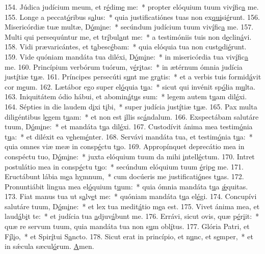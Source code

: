 154. Júdica judícium meum, et r\uline{é}dim\uline{e} me:~* propter elóquium tuum viv\uline{í}fic\uline{a} me.
155. Longe a peccat\uline{ó}ribus s\uline{a}lus:~* quia justificatiónes tuas non ex\uline{qui}si\uline{é}runt.
156. Misericórdiæ tuæ multæ, D\uline{ó}m\uline{i}ne:~* secúndum judícium tuum viv\uline{í}fic\uline{a} me.
157. Multi qui persequúntur me, et tr\uline{í}bul\uline{a}nt me:~* a testimóniis tuis non d\uline{e}clin\uline{á}vi.
158. Vidi prævaricántes, et t\uline{a}besc\uline{é}bam:~* quia elóquia tua non cust\uline{o}di\uline{é}runt.
159. Vide quóniam mandáta tua diléxi, D\uline{ó}m\uline{i}ne:~* in misericórdia tua viv\uline{í}fic\uline{a} me.
160. Princípium verbórum tuórum, v\uline{é}r\uline{i}tas:~* in ætérnum ómnia judícia just\uline{í}tiæ t\uline{u}æ.
161. Príncipes persecúti s\uline{u}nt me gr\uline{a}tis:~* et a verbis tuis formid\uline{á}vit cor m\uline{e}um.
162. Lætábor ego super el\uline{ó}quia t\uline{u}a:~* sicut qui invénit sp\uline{ó}lia m\uline{u}lta.
163. Iniquitátem ódio hábui, et abomin\uline{á}t\uline{u}s sum:~* legem autem t\uline{u}am dil\uline{é}xi.
164. Sépties in die laudem d\uline{i}xi t\uline{i}bi,~* super judícia just\uline{í}tiæ t\uline{u}æ.
165. Pax multa diligéntibus l\uline{e}gem t\uline{u}am:~* et non est \uline{i}llis sc\uline{á}ndalum.
166. Exspectábam salutáre tuum, D\uline{ó}m\uline{i}ne:~* et mandáta t\uline{u}a dil\uline{é}xi.
167. Custodívit ánima mea testim\uline{ó}nia t\uline{u}a:~* et diléxit ea v\uline{e}hem\uline{é}nter.
168. Servávi mandáta tua, et testim\uline{ó}nia t\uline{u}a:~* quia omnes viæ meæ in consp\uline{é}ctu t\uline{u}o.
169. Appropínquet deprecátio mea in conspéctu tuo, D\uline{ó}m\uline{i}ne:~* juxta elóquium tuum da mihi \uline{i}ntell\uline{é}ctum.
170. Intret postulátio mea in consp\uline{é}ctu t\uline{u}o:~* secúndum elóquium tuum \uline{é}rip\uline{e} me.
171. Eructábunt lábia m\uline{e}a h\uline{y}mnum,~* cum docúeris me justificati\uline{ó}nes t\uline{u}as.
172. Pronuntiábit lingua mea el\uline{ó}quium t\uline{u}um:~* quia ómnia mandáta t\uline{u}a \uline{ǽ}quitas.
173. Fiat manus tua ut s\uline{a}lv\uline{e}t me:~* quóniam mandáta t\uline{u}a el\uline{é}gi.
174. Concupívi salutáre tuum, D\uline{ó}m\uline{i}ne:~* et lex tua medit\uline{á}tio m\uline{e}a est.
175. Vivet ánima mea, et laud\uline{á}b\uline{i}t te:~* et judícia tua \uline{a}djuv\uline{á}bunt me.
176. Errávi, sicut ovis, quæ p\uline{é}r\uline{i}it:~* quæ re servum tuum, quia mandáta tua non s\uline{u}m obl\uline{í}tus.
177. Glória Patri, et F\uline{í}l\uline{i}o,~* et Spir\uline{í}tui S\uline{a}ncto.
178. Sicut erat in princípio, et n\uline{u}nc, et s\uline{e}mper,~* et in sǽcula sæcul\uline{ó}rum. \uline{A}men.
